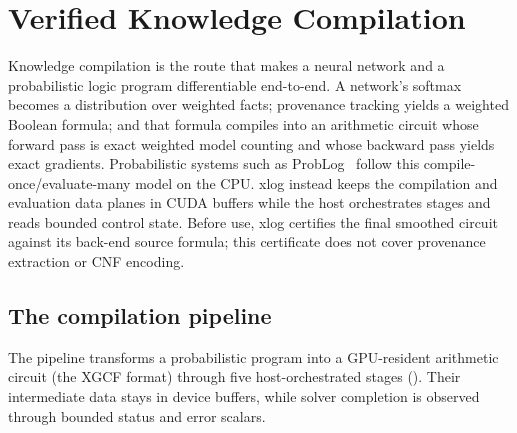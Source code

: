 \section{Verified Knowledge Compilation}\label{sec:prob}

Knowledge compilation is the route that makes a neural network and a probabilistic logic program differentiable end-to-end. A network's softmax becomes a distribution over weighted facts; provenance tracking yields a weighted Boolean formula; and that formula compiles into an arithmetic circuit whose forward pass is exact weighted model counting and whose backward pass yields exact gradients. Probabilistic systems such as ProbLog~\cite{problog2} follow this compile-once/evaluate-many model on the CPU. xlog instead keeps the compilation and evaluation data planes in CUDA buffers while the host orchestrates stages and reads bounded control state. Before use, xlog certifies the final smoothed circuit against its back-end source formula; this certificate does not cover provenance extraction or CNF encoding.

\subsection{The compilation pipeline}

The pipeline transforms a probabilistic program into a GPU-resident arithmetic circuit (the XGCF format) through five host-orchestrated stages (). Their intermediate data stays in device buffers, while solver completion is observed through bounded status and error scalars.

